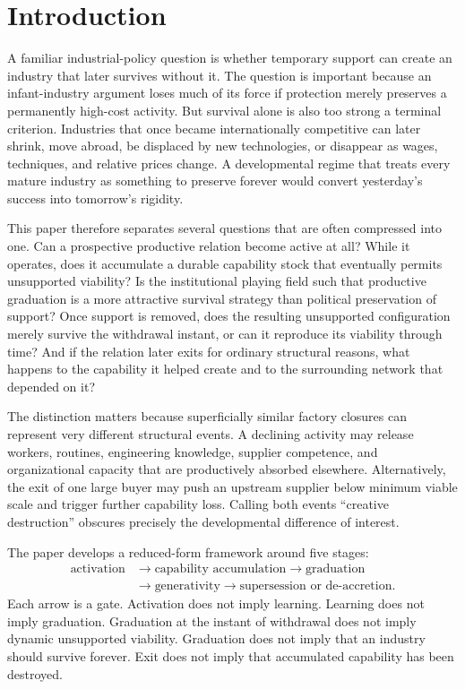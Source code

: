 \section{Introduction}
\label{sec:intro}

A familiar industrial-policy question is whether temporary support can create an industry that later survives without it. The question is important because an infant-industry argument loses much of its force if protection merely preserves a permanently high-cost activity. But survival alone is also too strong a terminal criterion. Industries that once became internationally competitive can later shrink, move abroad, be displaced by new technologies, or disappear as wages, techniques, and relative prices change. A developmental regime that treats every mature industry as something to preserve forever would convert yesterday's success into tomorrow's rigidity.

This paper therefore separates several questions that are often compressed into one. Can a prospective productive relation become active at all? While it operates, does it accumulate a durable capability stock that eventually permits unsupported viability? Is the institutional playing field such that productive graduation is a more attractive survival strategy than political preservation of support? Once support is removed, does the resulting unsupported configuration merely survive the withdrawal instant, or can it reproduce its viability through time? And if the relation later exits for ordinary structural reasons, what happens to the capability it helped create and to the surrounding network that depended on it?

The distinction matters because superficially similar factory closures can represent very different structural events. A declining activity may release workers, routines, engineering knowledge, supplier competence, and organizational capacity that are productively absorbed elsewhere. Alternatively, the exit of one large buyer may push an upstream supplier below minimum viable scale and trigger further capability loss. Calling both events ``creative destruction'' obscures precisely the developmental difference of interest.

The paper develops a reduced-form framework around five stages:
\begin{equation}
\begin{aligned}
\text{activation}
&\rightarrow
\text{capability accumulation}
\rightarrow
\text{graduation}\\
&\rightarrow
\text{generativity}
\rightarrow
\text{supersession or de-accretion}.
\end{aligned}
\label{eq:stages}
\end{equation}
Each arrow is a gate. Activation does not imply learning. Learning does not imply graduation. Graduation at the instant of withdrawal does not imply dynamic unsupported viability. Graduation does not imply that an industry should survive forever. Exit does not imply that accumulated capability has been destroyed.

